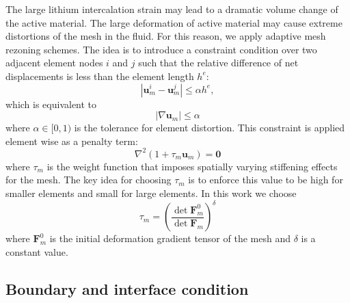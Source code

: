 The large lithium intercalation strain may lead to a dramatic volume change of the active material. The large deformation of active material may cause extreme distortions of the mesh in the fluid. For this reason, we apply adaptive mesh rezoning schemes. The idea is to introduce a constraint condition over two adjacent element nodes $i$ and $j$ such that the relative difference of net displacements is less than the element length $h^e$\+: \[ |\boldsymbol{u}_m^i-\boldsymbol{u}_m^j|\le\alpha h^e, \] which is equivalent to \[ |\nabla\boldsymbol{u}_m|\le\alpha \] where $\alpha\in[0,1)$ is the tolerance for element distortion. This constraint is applied element wise as a penalty term\+: \[ \nabla^2(1+\tau_m\boldsymbol{u}_m)=\boldsymbol{0} \] where $\tau_m$ is the weight function that imposes spatially varying stiffening effects for the mesh. The key idea for choosing $\tau_m$ is to enforce this value to be high for smaller elements and small for large elements. In this work we choose \[ \tau_m=\left(\frac{\det \boldsymbol{F}_m^0}{\det \boldsymbol{F}_m} \right)^\delta \] where $\boldsymbol{F}_m^0$ is the initial deformation gradient tensor of the mesh and $\delta$ is a constant value.\hypertarget{battery_particle_subsection3}{}\subsection{Boundary and interface condition}\label{battery_particle_subsection3}
